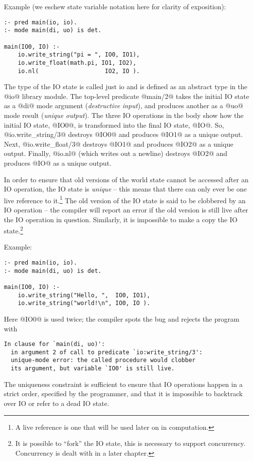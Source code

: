 Example (we eschew state variable notation here for clarity of
exposition):
\begin{verbatim}
:- pred main(io, io).
:- mode main(di, uo) is det.

main(IO0, IO) :-
    io.write_string("pi = ", IO0, IO1),
    io.write_float(math.pi, IO1, IO2),
    io.nl(                   IO2, IO ).
\end{verbatim}
The type of the IO state is called just io and is defined
as an abstract type in the @io@ library module.  The
top-level predicate @main/2@ takes the initial IO state as a
@di@ mode argument (\emph{destructive input}), and produces another as a
@uo@ mode result (\emph{unique output}).  The three IO operations in the body
show how the initial IO state, @IO0@, is transformed into
the final IO state, @IO@.  So, @io.write_string/3@ destroys
@IO0@ and produces @IO1@ as a unique output.  Next,
@io.write_float/3@ destroys @IO1@ and produces @IO2@ as a
unique output.  Finally, @io.nl@ (which writes out a
newline) destroys @IO2@ and produces @IO@ as a unique output.

In order to ensure that old versions of the world state cannot
be accessed after an IO operation, the IO state is \emph{unique} --
this means that there can only ever be one live reference to
it.\footnote{A live reference is one that will be used
later on in computation.}  The old version of the IO state
is said to be clobbered by an IO operation -- the compiler will
report an error if the old version is still live after the IO
operation in question.  Similarly, it is impossible to make a
copy the IO state.\footnote{It is possible to ``fork'' the IO
state, this is necessary to support concurrency.  Concurrency
is dealt with in a later chapter. \XXX{}}

Example:
\begin{verbatim}
:- pred main(io, io).
:- mode main(di, uo) is det.

main(IO0, IO) :-
    io.write_string("Hello, ",  IO0, IO1),
    io.write_string("world!\n", IO0, IO ).
\end{verbatim}
Here @IO0@ is used twice; the compiler spots the bug and
rejects the program with
\begin{verbatim}
In clause for `main(di, uo)':
  in argument 2 of call to predicate `io:write_string/3':
  unique-mode error: the called procedure would clobber
  its argument, but variable `IO0' is still live.
\end{verbatim}
The uniqueness constraint is sufficient to ensure that IO
operations happen in a strict order, specified by the
programmer, and that it is impossible to backtrack over IO or
refer to a dead IO state.

